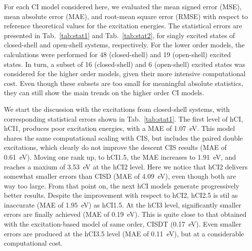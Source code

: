 \documentclass[aip,jcp,reprint,noshowkeys,superscriptaddress]{revtex4-1}
\begin{document}
For each CI model considered here, we evaluated the mean signed error (MSE), mean absolute error (MAE), and root-mean square error (RMSE) 
with respect to reference theoretical values for the excitation energies.
The statistical errors are presented in Tab.~\ref{tab:stat1} and Tab.~\ref{tab:stat2},
for singly excited states of closed-shell and open-shell systems, respectively.
For the lower order models, the calculations were performed for 48 (closed-shell) and 19 (open-shell) excited states.
In turn, a subset of 16 (closed-shell) and 6 (open-shell) excited states was considered for the higher order models, given their more intensive computational cost.
Even though these subsets are too small for meaningful absolute statistics, they can still show the main trends on the higher order CI models.


We start the discussion with the excitations from closed-shell systems, with corresponding statistical errors shown in Tab.~\ref{tab:stat1}.
%
The first level of hCI, hCI1, produces poor excitation energies, with a MAE of \SI{1.07}{\eV}.
This model shares the same computational scaling with CIS, but includes the paired double excitations, 
which clearly do not improve the descent CIS results (MAE of \SI{0.61}{\eV}).
Moving one rank up, to hCI1.5, the MAE increases to \SI{1.91}{\eV}, and reaches a maxium of \SI{3.53}{\eV} at the hCI2 level.
Here we notice that hCI2 delivers somewhat smaller errors than CISD (MAE of \SI{4.09}{\eV}), even though both are way too large.
From that point on, the next hCI models generate progressively better results.
Despite the improvement with respect to hCI2, hCI2.5 is stil as inaccurate (MAE of \SI{1.95}{\eV}) as hCI1.5.
At the hCI3 level, significantly smaller errors are finally achieved (MAE of \SI{0.19}{\eV}).
This is quite close to that obtained with the excitation-based model of same order, CISDT (\SI{0.17}{\eV}).
Even smaller errors are produced at the hCI3.5 level (MAE of \SI{0.11}{\eV}), but at a considerable computational cost.

\end{document}
